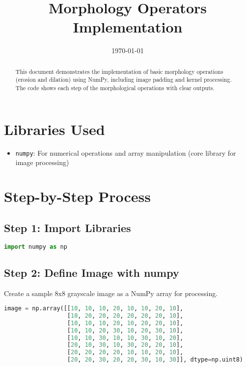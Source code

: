 \documentclass[12pt]{article}
\title{Morphology Operators Implementation}
\date{\today}
\begin{document}
\maketitle

\begin{abstract}
This document demonstrates the implementation of basic morphology operations (erosion and dilation) using NumPy, including image padding and kernel processing. The code shows each step of the morphological operations with clear outputs.
\end{abstract}

\section{Libraries Used}
\begin{itemize}
    \item \texttt{numpy}: For numerical operations and array manipulation (core library for image processing)
\end{itemize}

\section{Step-by-Step Process}

\subsection{Step 1: Import Libraries}
\begin{lstlisting}[language=Python]
import numpy as np
\end{lstlisting}

\subsection{Step 2: Define Image with numpy}
Create a sample 8x8 grayscale image as a NumPy array for processing.

\begin{lstlisting}[language=Python]
image = np.array([[10, 10, 10, 20, 10, 10, 20, 10],
                  [10, 20, 20, 20, 20, 20, 20, 10],
                  [10, 10, 10, 20, 10, 20, 20, 10],
                  [10, 10, 20, 30, 10, 20, 30, 10],
                  [10, 10, 30, 10, 10, 30, 10, 20],
                  [20, 10, 30, 10, 30, 20, 20, 10],
                  [20, 20, 20, 20, 10, 10, 20, 10],
                  [20, 20, 30, 20, 20, 30, 10, 30]], dtype=np.uint8)
\end{lstlisting}
\end{document}
